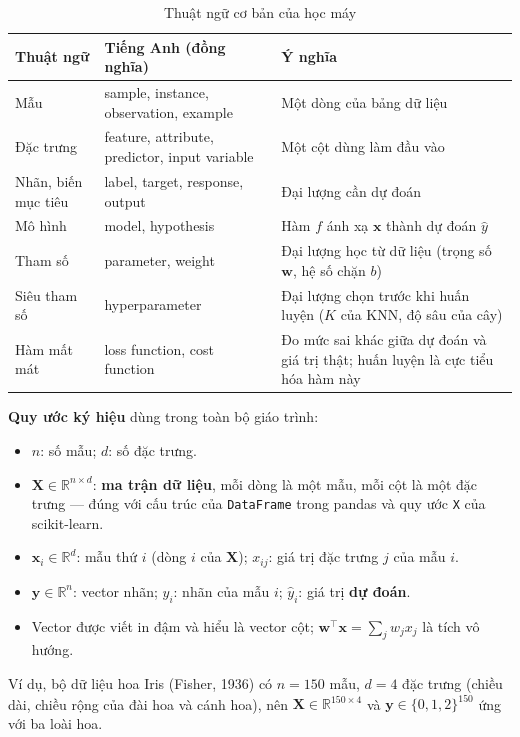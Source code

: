 \begin{table}[H]
\centering
\begin{tabular}{|p{3.2cm}|p{4.2cm}|p{5.6cm}|}
\hline
\textbf{Thuật ngữ} & \textbf{Tiếng Anh (đồng nghĩa)} & \textbf{Ý nghĩa} \\
\hline
Mẫu & sample, instance, observation, example & Một dòng của bảng dữ liệu \\ \hline
Đặc trưng & feature, attribute, predictor, input variable & Một cột dùng làm đầu vào \\ \hline
Nhãn, biến mục tiêu & label, target, response, output & Đại lượng cần dự đoán \\ \hline
Mô hình & model, hypothesis & Hàm $f$ ánh xạ $\mathbf{x}$ thành dự đoán $\hat{y}$ \\ \hline
Tham số & parameter, weight & Đại lượng học từ dữ liệu (trọng số $\mathbf{w}$, hệ số chặn $b$) \\ \hline
Siêu tham số & hyperparameter & Đại lượng chọn trước khi huấn luyện ($K$ của KNN, độ sâu của cây) \\ \hline
Hàm mất mát & loss function, cost function & Đo mức sai khác giữa dự đoán và giá trị thật; huấn luyện là cực tiểu hóa hàm này \\ \hline
\end{tabular}
\caption{Thuật ngữ cơ bản của học máy}
\label{tab:ml-terms}
\end{table}

\noindent\textbf{Quy ước ký hiệu} dùng trong toàn bộ giáo trình:
\begin{itemize}
    \item $n$: số mẫu; $d$: số đặc trưng.
    \item $\mathbf{X} \in \mathbb{R}^{n \times d}$: \textbf{ma trận dữ liệu}, mỗi dòng là một mẫu, mỗi cột là một đặc trưng --- đúng với cấu trúc của \texttt{DataFrame} trong pandas và quy ước \texttt{X} của scikit-learn.
    \item $\mathbf{x}_i \in \mathbb{R}^{d}$: mẫu thứ $i$ (dòng $i$ của $\mathbf{X}$); $x_{ij}$: giá trị đặc trưng $j$ của mẫu $i$.
    \item $\mathbf{y} \in \mathbb{R}^{n}$: vector nhãn; $y_i$: nhãn của mẫu $i$; $\hat{y}_i$: giá trị \textbf{dự đoán}.
    \item Vector được viết in đậm và hiểu là vector cột; $\mathbf{w}^\top\mathbf{x} = \sum_{j} w_j x_j$ là tích vô hướng.
\end{itemize}
Ví dụ, bộ dữ liệu hoa Iris (Fisher, 1936) có $n = 150$ mẫu, $d = 4$ đặc trưng (chiều dài, chiều rộng của đài hoa và cánh hoa), nên $\mathbf{X} \in \mathbb{R}^{150 \times 4}$ và $\mathbf{y} \in \{0, 1, 2\}^{150}$ ứng với ba loài hoa.

